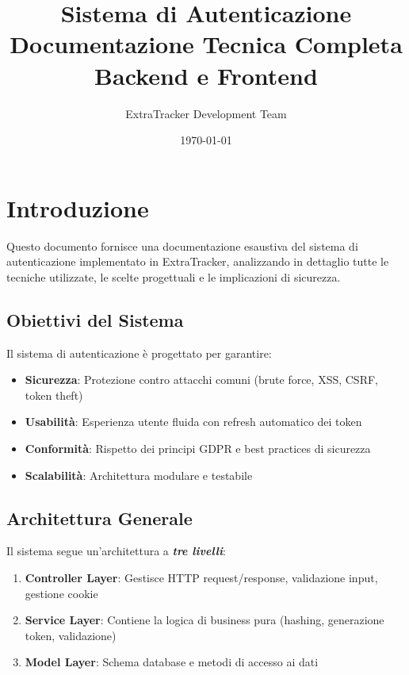 \documentclass[11pt,a4paper]{article}
\title{
    \vspace{-2cm}
    \textbf{\Huge Sistema di Autenticazione}\\
    \Large Documentazione Tecnica Completa\\
    \large Backend e Frontend
    \vspace{0.5cm}
}
\author{ExtraTracker Development Team}
\date{\today}
\newcommand{\tech}[1]{\textbf{\textit{#1}}}
\begin{document}
\maketitle
\thispagestyle{empty}

\newpage
\tableofcontents
\newpage

\section{Introduzione}

Questo documento fornisce una documentazione esaustiva del sistema di autenticazione implementato in ExtraTracker, analizzando in dettaglio tutte le tecniche utilizzate, le scelte progettuali e le implicazioni di sicurezza.

\subsection{Obiettivi del Sistema}

Il sistema di autenticazione è progettato per garantire:

\begin{itemize}
    \item \textbf{Sicurezza}: Protezione contro attacchi comuni (brute force, XSS, CSRF, token theft)
    \item \textbf{Usabilità}: Esperienza utente fluida con refresh automatico dei token
    \item \textbf{Conformità}: Rispetto dei principi GDPR e best practices di sicurezza
    \item \textbf{Scalabilità}: Architettura modulare e testabile
\end{itemize}

\subsection{Architettura Generale}

Il sistema segue un'architettura a \tech{tre livelli}:

\begin{enumerate}
    \item \textbf{Controller Layer}: Gestisce HTTP request/response, validazione input, gestione cookie
    \item \textbf{Service Layer}: Contiene la logica di business pura (hashing, generazione token, validazione)
    \item \textbf{Model Layer}: Schema database e metodi di accesso ai dati
\end{enumerate}
\end{document}
